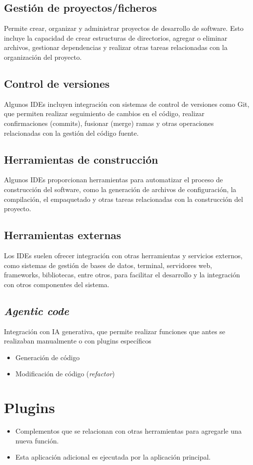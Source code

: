 \documentclass[a4paper]{article}
\begin{document}
\subsection{Gestión de proyectos/ficheros}
\label{sec:org0000009}
Permite crear, organizar y administrar proyectos de desarrollo de software. Esto incluye la capacidad de crear estructuras de directorios, agregar o eliminar archivos, gestionar dependencias y realizar otras tareas relacionadas con la organización del proyecto.
\subsection{Control de versiones}
\label{sec:org000000c}
Algunos IDEs incluyen integración con sistemas de control de versiones como Git, que permiten realizar seguimiento de cambios en el código, realizar confirmaciones (commits), fusionar (merge) ramas y otras operaciones relacionadas con la gestión del código fuente.
\subsection{Herramientas de construcción}
\label{sec:org000000f}
Algunos IDEs proporcionan herramientas para automatizar el proceso de construcción del software, como la generación de archivos de configuración, la compilación, el empaquetado y otras tareas relacionadas con la construcción del proyecto.
\subsection{Herramientas externas}
\label{sec:org0000012}
Los IDEs suelen ofrecer integración con otras herramientas y servicios externos, como sistemas de gestión de bases de datos, terminal, servidores web, frameworks, bibliotecas, entre otros, para facilitar el desarrollo y la integración con otros componentes del sistema.
\subsection{\emph{Agentic code}}
\label{sec:org0000015}
Integración con IA generativa, que permite realizar funciones que antes se realizaban manualmente o con plugins específicos
\begin{itemize}
\item Generación de código
\item Modificación de código (\emph{refactor})
\end{itemize}
\section{Plugins}
\label{sec:org000001b}
\begin{itemize}
\item Complementos que se relacionan con otras herramientas para agregarle una nueva función.
\item Esta aplicación adicional es ejecutada por la aplicación principal.
\end{itemize}
\end{document}
